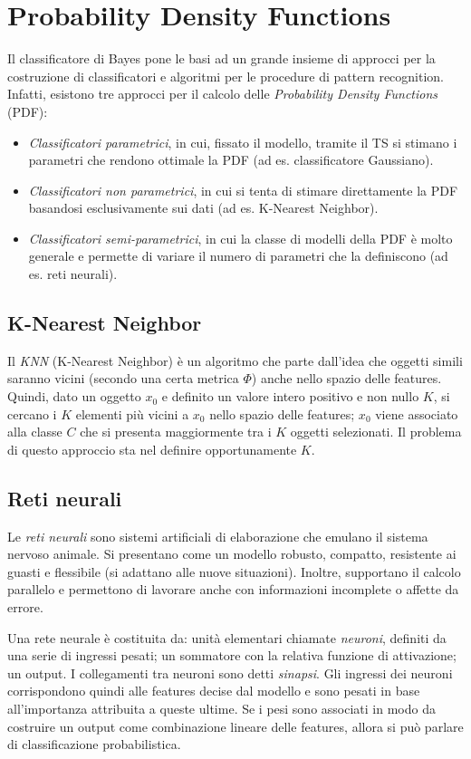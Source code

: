 \documentclass[a4paper,oneside,titlepage]{book}
\begin{document}
\section{Probability Density Functions}
Il classificatore di Bayes pone le basi ad un grande insieme di approcci per la costruzione di classificatori e algoritmi per le procedure di pattern recognition. Infatti, esistono tre approcci per il calcolo delle \textit{Probability Density Functions} (PDF):
\begin{itemize}
    \item \textit{Classificatori parametrici}, in cui, fissato il modello, tramite il TS si stimano i parametri che rendono ottimale la PDF (ad es. classificatore Gaussiano).
    \item \textit{Classificatori non parametrici}, in cui si tenta di stimare direttamente la PDF basandosi esclusivamente sui dati (ad es. K-Nearest Neighbor).
    \item \textit{Classificatori semi-parametrici}, in cui la classe di modelli della PDF è molto generale e permette di variare il numero di parametri che la definiscono (ad es. reti neurali).
\end{itemize}

\subsection{K-Nearest Neighbor}
Il \textit{KNN} (K-Nearest Neighbor) è un algoritmo che parte dall'idea che oggetti simili saranno vicini (secondo una certa metrica $\Phi$) anche nello spazio delle features. Quindi, dato un oggetto $x_0$ e definito un valore intero positivo e non nullo $K$, si cercano i $K$ elementi più vicini a $x_0$ nello spazio delle features; $x_0$ viene associato alla classe $C$ che si presenta maggiormente tra i $K$ oggetti selezionati. Il problema di questo approccio sta nel definire opportunamente $K$.

\subsection{Reti neurali}
Le \textit{reti neurali} sono sistemi artificiali di elaborazione che emulano il sistema nervoso animale. Si presentano come un modello robusto, compatto, resistente ai guasti e flessibile (si adattano alle nuove situazioni). Inoltre, supportano il calcolo parallelo e permettono di lavorare anche con informazioni incomplete o affette da errore.

Una rete neurale è costituita da: unità elementari chiamate \textit{neuroni}, definiti da una serie di ingressi pesati; un sommatore con la relativa funzione di attivazione; un output. I collegamenti tra neuroni sono detti \textit{sinapsi}. Gli ingressi dei neuroni corrispondono quindi alle features decise dal modello e sono pesati in base all'importanza attribuita a queste ultime. Se i pesi sono associati in modo da costruire un output come combinazione
lineare delle features, allora si può parlare di classificazione probabilistica.
\end{document}
